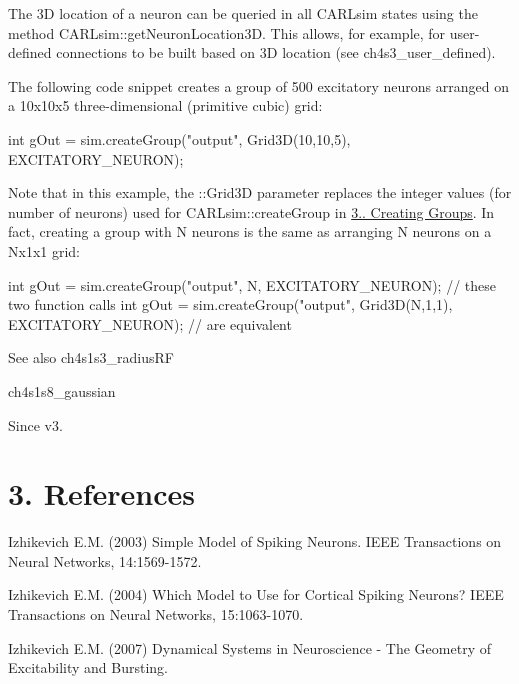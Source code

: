 The 3D location of a neuron can be queried in all C\+A\+R\+Lsim states using the method C\+A\+R\+Lsim\+::get\+Neuron\+Location3D. This allows, for example, for user-\/defined connections to be built based on 3D location (see ch4s3\+\_\+user\+\_\+defined).

The following code snippet creates a group of 500 excitatory neurons arranged on a 10x10x5 three-\/dimensional (primitive cubic) grid\+: 
\begin{DoxyCode}
\textcolor{keywordtype}{int} gOut = sim.createGroup(\textcolor{stringliteral}{"output"}, Grid3D(10,10,5), EXCITATORY\_NEURON);
\end{DoxyCode}


Note that in this example, the \+::\+Grid3D parameter replaces the integer values (for number of neurons) used for C\+A\+R\+Lsim\+::create\+Group in \hyperlink{ch3_neurons_synapses_groups_ch3s3s1_creating_groups}{3.. Creating Groups}. In fact, creating a group with N neurons is the same as arranging N neurons on a Nx1x1 grid\+: 
\begin{DoxyCode}
\textcolor{keywordtype}{int} gOut = sim.createGroup(\textcolor{stringliteral}{"output"}, N, EXCITATORY\_NEURON);             \textcolor{comment}{// these two function calls}
\textcolor{keywordtype}{int} gOut = sim.createGroup(\textcolor{stringliteral}{"output"}, Grid3D(N,1,1), EXCITATORY\_NEURON); \textcolor{comment}{// are equivalent}
\end{DoxyCode}


\begin{DoxySeeAlso}{See also}
ch4s1s3\+\_\+radius\+RF 

ch4s1s8\+\_\+gaussian 
\end{DoxySeeAlso}
\begin{DoxySince}{Since}
v3.
\end{DoxySince}
\hypertarget{ch3_neurons_synapses_groups_ch3s5_refs}{}\section{3. References}\label{ch3_neurons_synapses_groups_ch3s5_refs}
Izhikevich E.\+M. (2003) Simple Model of Spiking Neurons. I\+E\+EE Transactions on Neural Networks, 14\+:1569-\/1572.

Izhikevich E.\+M. (2004) Which Model to Use for Cortical Spiking Neurons? I\+E\+EE Transactions on Neural Networks, 15\+:1063-\/1070.

Izhikevich E.\+M. (2007) Dynamical Systems in Neuroscience -\/ The Geometry of Excitability and Bursting. 